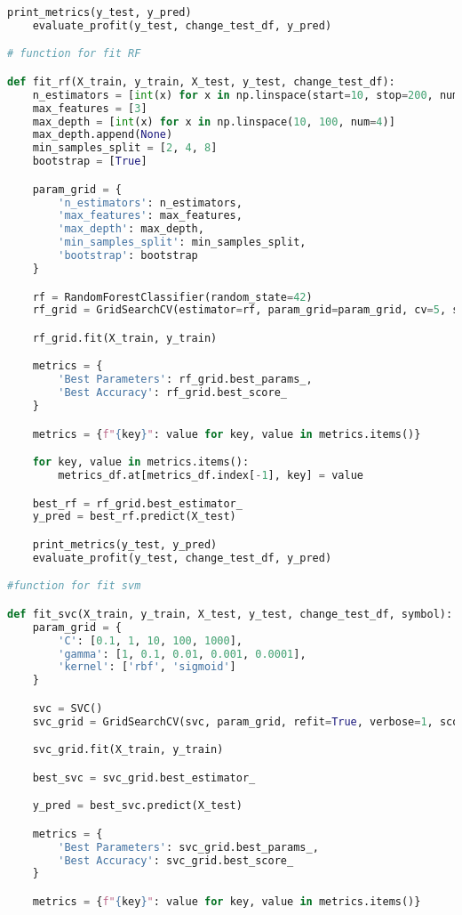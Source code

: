 \begin{lstlisting}[language=Python]
    print_metrics(y_test, y_pred)
    evaluate_profit(y_test, change_test_df, y_pred)

# function for fit RF

def fit_rf(X_train, y_train, X_test, y_test, change_test_df):
    n_estimators = [int(x) for x in np.linspace(start=10, stop=200, num=6)]
    max_features = [3]
    max_depth = [int(x) for x in np.linspace(10, 100, num=4)]
    max_depth.append(None)
    min_samples_split = [2, 4, 8]
    bootstrap = [True]

    param_grid = {
        'n_estimators': n_estimators,
        'max_features': max_features,
        'max_depth': max_depth,
        'min_samples_split': min_samples_split,
        'bootstrap': bootstrap
    }

    rf = RandomForestClassifier(random_state=42)
    rf_grid = GridSearchCV(estimator=rf, param_grid=param_grid, cv=5, scoring='accuracy', n_jobs=-1)

    rf_grid.fit(X_train, y_train)

    metrics = {
        'Best Parameters': rf_grid.best_params_,
        'Best Accuracy': rf_grid.best_score_
    }

    metrics = {f"{key}": value for key, value in metrics.items()}

    for key, value in metrics.items():
        metrics_df.at[metrics_df.index[-1], key] = value

    best_rf = rf_grid.best_estimator_
    y_pred = best_rf.predict(X_test)

    print_metrics(y_test, y_pred)
    evaluate_profit(y_test, change_test_df, y_pred)

#function for fit svm

def fit_svc(X_train, y_train, X_test, y_test, change_test_df, symbol):
    param_grid = {
        'C': [0.1, 1, 10, 100, 1000],
        'gamma': [1, 0.1, 0.01, 0.001, 0.0001],
        'kernel': ['rbf', 'sigmoid']
    }

    svc = SVC()
    svc_grid = GridSearchCV(svc, param_grid, refit=True, verbose=1, scoring='accuracy', n_jobs=-1, cv =5)

    svc_grid.fit(X_train, y_train)

    best_svc = svc_grid.best_estimator_

    y_pred = best_svc.predict(X_test)

    metrics = {
        'Best Parameters': svc_grid.best_params_,
        'Best Accuracy': svc_grid.best_score_
    }

    metrics = {f"{key}": value for key, value in metrics.items()}


\end{lstlisting}
